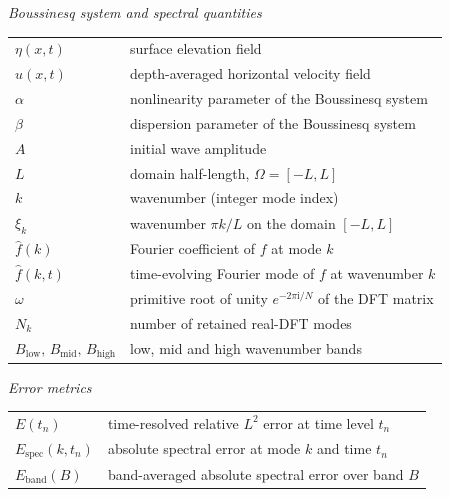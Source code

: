 \vspace{0.5cm}
\noindent\textit{Boussinesq system and spectral quantities}\\[2pt]
\noindent
\begin{tabular}{@{}p{3.4cm}p{12cm}@{}}
    $\eta(x,t)$      & surface elevation field \\[2pt]
    $u(x,t)$         & depth-averaged horizontal velocity field \\[2pt]
    $\alpha$         & nonlinearity parameter of the Boussinesq system \\[2pt]
    $\beta$          & dispersion parameter of the Boussinesq system \\[2pt]
    $A$              & initial wave amplitude \\[2pt]
    $L$              & domain half-length, $\Omega = [-L, L]$ \\[2pt]
    $k$              & wavenumber (integer mode index) \\[2pt]
    $\xi_k$          & wavenumber $\pi k / L$ on the domain $[-L,L]$ \\[2pt]
    $\hat{f}(k)$     & Fourier coefficient of $f$ at mode $k$ \\[2pt]
    $\hat{f}(k,t)$   & time-evolving Fourier mode of $f$ at wavenumber $k$ \\[2pt]
    $\omega$         & primitive root of unity $e^{-2\pi \mathrm{i}/N}$ of the DFT matrix \\[2pt]
    $N_k$            & number of retained real-DFT modes \\[2pt]
    $B_{\mathrm{low}},\,B_{\mathrm{mid}},\,B_{\mathrm{high}}$ & low, mid and high wavenumber bands \\
\end{tabular}

\vspace{0.5cm}
\noindent\textit{Error metrics}\\[2pt]
\noindent
\begin{tabular}{@{}p{3.4cm}p{12cm}@{}}
    $E(t_n)$ & time-resolved relative $L^2$ error at time level $t_n$ \\[2pt]
    $E_{\mathrm{spec}}(k,t_n)$ & absolute spectral error at mode $k$ and time $t_n$ \\[2pt]
    $E_{\mathrm{band}}(B)$ & band-averaged absolute spectral error over band $B$ \\
\end{tabular}

